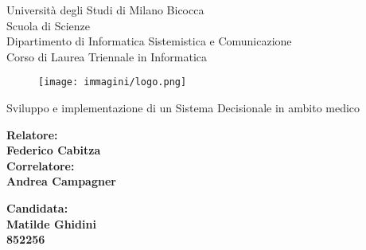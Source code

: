 \documentclass[12pt]{report}
\begin{document}
\begin{titlepage}
\begin{center}
    {\LARGE{Università degli Studi di Milano Bicocca \\}}
    {Scuola di Scienze}\\
    {Dipartimento di Informatica Sistemistica e Comunicazione}\\
    {Corso di Laurea Triennale in Informatica}
\end{center}
    
\begin{figure}[H]
    \centering
    \texttt{[image: immagini/logo.png]}
\end{figure}

\begin{center}
    {\Large { Sviluppo e implementazione di un Sistema Decisionale in ambito medico }}
\end{center}

\vspace{2cm}

\begin{minipage}[t]{0.47\textwidth}
	{\large{\bf Relatore:\\ Federico Cabitza }}
	\vspace{0.5cm}
	{\large{\bf \\Correlatore:\\ Andrea Campagner }}
\end{minipage}\hfill\begin{minipage}[t]{0.47\textwidth}\raggedleft
	{\large{\bf Candidata: \\Matilde Ghidini\\ 852256 }}
\end{minipage}

\vspace{25mm}

\end{titlepage}



\thispagestyle{empty}

\tableofcontents
\thispagestyle{empty}

\listoffigures

\thispagestyle{empty}
\clearpage

\setcounter{page}{1}


\clearpage


\clearpage


\clearpage




\clearpage


\clearpage

\printbibliography
\end{document}
